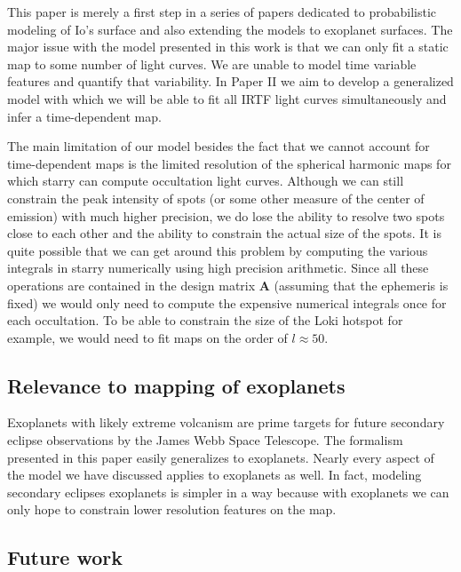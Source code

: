 \documentclass[modern]{aastex62}
\begin{document}
This paper is merely a first step in a series of papers dedicated to probabilistic modeling of Io's surface and also extending the models to exoplanet surfaces. 
The major issue with the model presented in this work is that we can only fit a static map to some number of light curves.
We are unable to model time variable features and quantify that variability.
In Paper II we aim to develop a generalized model with which we will be able to fit all IRTF light curves simultaneously and infer a time-dependent map.

The main limitation of our model besides the fact that we cannot account for time-dependent maps is the limited resolution of the spherical harmonic maps for which \textsf{starry} can compute occultation light curves.
Although we can still constrain the peak intensity of spots (or some other measure of the center of emission) with much higher precision, we do lose the ability to resolve two spots close to each other and the ability to constrain the actual size of the spots. 
It is quite possible that we can get around this problem by computing the various integrals in starry numerically using high precision arithmetic.
Since all these operations are contained in the design matrix $\mathbf{A}$ (assuming that the ephemeris is fixed) we would only need to compute the expensive numerical integrals once for each occultation.
To be able to constrain the size of the Loki hotspot for example, we would need to fit maps on the order of $l\approx 50$.

\subsection{Relevance to mapping of exoplanets} 
Exoplanets with likely extreme volcanism are prime targets for future secondary eclipse observations by the James Webb Space Telescope. 
The formalism presented in this paper easily generalizes to exoplanets. 
Nearly every aspect of the model we have discussed applies to exoplanets as well.
In fact, modeling secondary eclipses exoplanets is simpler in a way because with exoplanets we can only hope to constrain lower resolution features on the map.

\subsection{Future work}

\appendix
\end{document}
